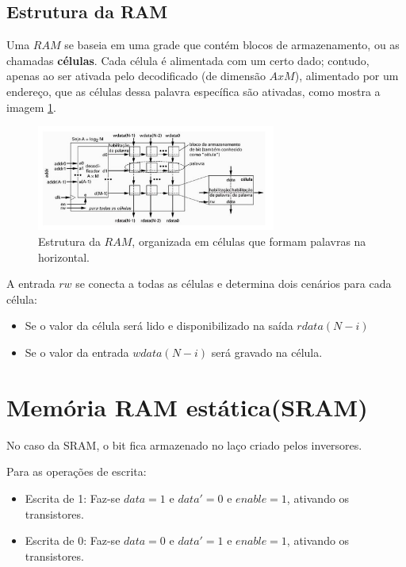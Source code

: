 \documentclass{article}
\begin{document}
 
\subsection{Estrutura da RAM}

Uma $RAM$ se baseia em uma grade que contém blocos de armazenamento, ou as chamadas \textbf{células}. Cada célula é alimentada com um certo dado; contudo, apenas ao ser ativada pelo decodificado (de dimensão $AxM$), alimentado por um endereço, que as células dessa palavra específica são ativadas, como mostra a imagem \ref{fig:estruturaRam}.

\begin{figure}[h!] 
    \centering 
    \includegraphics[width=0.7\textwidth]{estruturaRam.jpg}
    \caption{Estrutura da $RAM$, organizada em células que formam palavras na horizontal.} 
    \label{fig:estruturaRam} 
\end{figure}

A entrada $rw$ se conecta a todas as células e determina dois cenários para cada célula:
\begin{itemize}
     \item Se o valor da célula será lido e disponibilizado na saída $rdata(N-i)$
     \item Se o valor da entrada $wdata(N-i)$ será gravado na célula.
\end{itemize}

\section{Memória RAM estática(SRAM)}
No caso da SRAM, o bit fica armazenado no laço criado pelos inversores.

Para as operações de escrita:
\begin{itemize}
     \item Escrita de 1: Faz-se $data=1$ e $data'= 0$ e $enable = 1$, ativando os transistores.
     \item Escrita de 0: Faz-se $data=0$ e $data'= 1$ e $enable = 1$, ativando os transistores.
\end{itemize}
\end{document}
